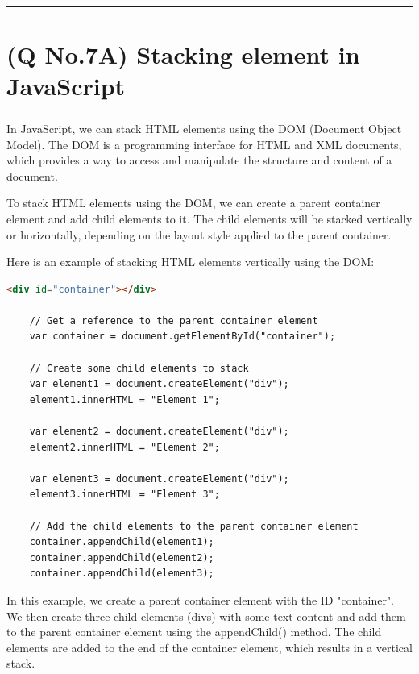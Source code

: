 \documentclass[11pt]{article}
\begin{document}
\noindent\rule{\linewidth}{0.4pt}
\section{(Q No.7A) Stacking element in JavaScript} 
\subparagraph{}
In JavaScript, we can stack HTML elements using the DOM (Document Object Model). The DOM is a programming interface for HTML and XML documents, which provides a way to access and manipulate the structure and content of a document.

To stack HTML elements using the DOM, we can create a parent container element and add child elements to it. The child elements will be stacked vertically or horizontally, depending on the layout style applied to the parent container.

Here is an example of stacking HTML elements vertically using the DOM:

\begin{lstlisting}[language=html]
    <div id="container"></div>

    // Get a reference to the parent container element
    var container = document.getElementById("container");

    // Create some child elements to stack
    var element1 = document.createElement("div");
    element1.innerHTML = "Element 1";

    var element2 = document.createElement("div");
    element2.innerHTML = "Element 2";

    var element3 = document.createElement("div");
    element3.innerHTML = "Element 3";

    // Add the child elements to the parent container element
    container.appendChild(element1);
    container.appendChild(element2);
    container.appendChild(element3);

\end{lstlisting}

In this example, we create a parent container element with the ID "container". We then create three child elements (divs) with some text content and add them to the parent container element using the appendChild() method. The child elements are added to the end of the container element, which results in a vertical stack.
\end{document}
